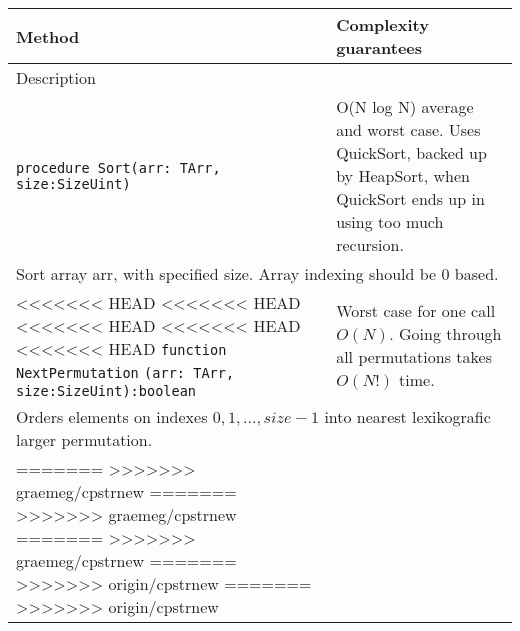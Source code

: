 \begin{longtable}{|m{10cm}|m{5cm}|}
\hline
Method & Complexity guarantees \\ \hline
\multicolumn{2}{|m{15cm}|}{Description} \\ \hline\hline

\verb!procedure Sort(arr: TArr, size:SizeUint)! &
O(N log N) average and worst case. Uses QuickSort, backed up by HeapSort, when QuickSort ends up in
using too much recursion.\\ \hline
\multicolumn{2}{|m{15cm}|}{Sort array arr, with specified size. Array indexing should be 0 based.} \\\hline\hline

<<<<<<< HEAD
<<<<<<< HEAD
<<<<<<< HEAD
<<<<<<< HEAD
<<<<<<< HEAD
\verb!function NextPermutation! \verb!(arr: TArr, size:SizeUint):boolean! &
Worst case for one call $O(N)$. Going through all permutations takes $O(N!)$ time.\\ \hline
\multicolumn{2}{|m{15cm}|}{Orders elements on indexes $0, 1, \dots, size-1$ into nearest
lexikografic larger permutation.} \\\hline


=======
>>>>>>> graemeg/cpstrnew
=======
>>>>>>> graemeg/cpstrnew
=======
>>>>>>> graemeg/cpstrnew
=======
>>>>>>> origin/cpstrnew
=======
>>>>>>> origin/cpstrnew
\end{longtable}
